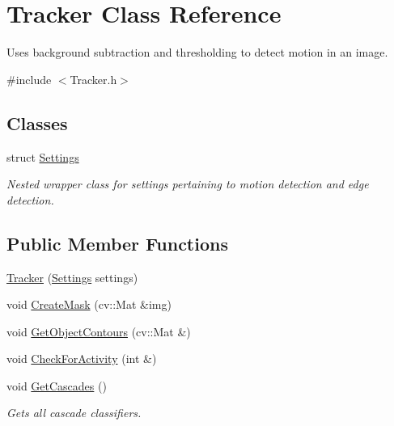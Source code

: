 \hypertarget{class_tracker}{}\section{Tracker Class Reference}
\label{class_tracker}


Uses background subtraction and thresholding to detect motion in an image.  




{\ttfamily \#include $<$Tracker.\+h$>$}

\subsection*{Classes}
\begin{DoxyCompactItemize}
\item 
struct \mbox{\hyperlink{struct_tracker_1_1_settings}{Settings}}
\begin{DoxyCompactList}\small\item\em Nested wrapper class for settings pertaining to motion detection and edge detection. \end{DoxyCompactList}\end{DoxyCompactItemize}
\subsection*{Public Member Functions}
\begin{DoxyCompactItemize}
\item 
\mbox{\hyperlink{class_tracker_ae21ec1606548b5b8de682e29734743fd}{Tracker}} (\mbox{\hyperlink{struct_tracker_1_1_settings}{Settings}} settings)
\item 
void \mbox{\hyperlink{class_tracker_af7bbb0a0156ad28f80e1fccaa9b94ba4}{Create\+Mask}} (cv\+::\+Mat \&img)
\item 
void \mbox{\hyperlink{class_tracker_ab7f677682b169cb7276797a511d12947}{Get\+Object\+Contours}} (cv\+::\+Mat \&)
\item 
void \mbox{\hyperlink{class_tracker_a4213b47312e51570ecbd744f7c1f6995}{Check\+For\+Activity}} (int \&)
\item 
\mbox{\label{class_tracker_aa06e5f3e1077446b967268aaecda6ae2}} 
void \mbox{\hyperlink{class_tracker_aa06e5f3e1077446b967268aaecda6ae2}{Get\+Cascades}} ()
\begin{DoxyCompactList}\small\item\em Gets all cascade classifiers. \end{DoxyCompactList}\end{DoxyCompactItemize}
